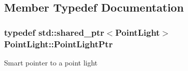 \subsection{Member Typedef Documentation}
\hypertarget{classPointLight_a48c8893ebd8015da2cb3d552f800e4e7}{
\subsubsection[{Point\+Light\+Ptr}]{\setlength{\rightskip}{0pt plus 5cm}typedef std\+::shared\+\_\+ptr$<${\bf Point\+Light}$>$ {\bf Point\+Light\+::\+Point\+Light\+Ptr}}}\label{classPointLight_a48c8893ebd8015da2cb3d552f800e4e7}
Smart pointer to a point light 

